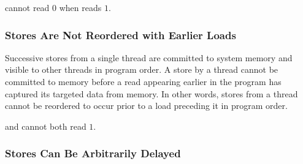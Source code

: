 \noindent
{} cannot read $0$ when  reads $1$.

\newpage

\subsubsection*{Stores Are Not Reordered with Earlier Loads}

Successive stores from a single thread are committed to system memory and visible to other threads in program order.
A store by a thread cannot be committed to memory before a read appearing earlier in the program has captured its targeted data from memory.
In other words, stores from a thread cannot be reordered to occur prior to a load preceding it in program order.

\begin{table}[!hbt]
\noindent{}
\caption{Stores Are Not Reordered with Older Loads \cite[Example 2]{ref:AMD}}
\label{tbl:litmus:amd:2}
\end{table}

\noindent
{} and  cannot both read $1$.

\subsubsection*{Stores Can Be Arbitrarily Delayed}

